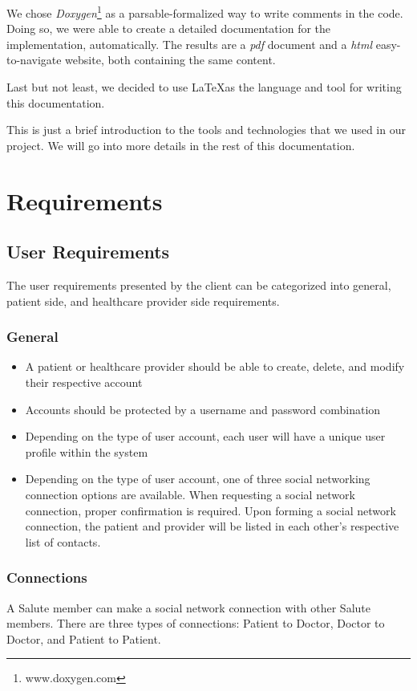 \documentclass[10pt]{report}
\begin{document}
We chose \emph{Doxygen}\footnote{www.doxygen.com} as a parsable-formalized way to write comments in the code. Doing so, we were able to create a detailed documentation for the implementation, automatically. The results are a \emph{pdf} document and a \emph{html} easy-to-navigate website, both containing the same content.

Last but not least, we decided to use \LaTeX as the language and tool for writing this documentation.

This is just a brief introduction to the tools and technologies that we used in our project. We will go into more details in the rest of this documentation.

\part{Requirements}
\chapter{User Requirements}
The user requirements presented by the client can be categorized into general, patient side, and healthcare provider side requirements.

\section{General}
\begin{itemize}
\item A patient or healthcare provider should be able to create, delete, and modify their respective account
\item Accounts should be protected by a username and password combination
\item Depending on the type of user account, each user will have a unique user profile within the system
\item Depending on the type of user account, one of three social networking connection options are available. When requesting a social network connection, proper confirmation is required.  Upon forming a social network connection, the patient and provider will be listed in each other's respective list of contacts.
\end{itemize} 

\section{Connections}
A Salute member can make a social network connection with other Salute members. There are three types of connections: Patient to Doctor, Doctor to Doctor, and Patient to Patient. 
\end{document}
